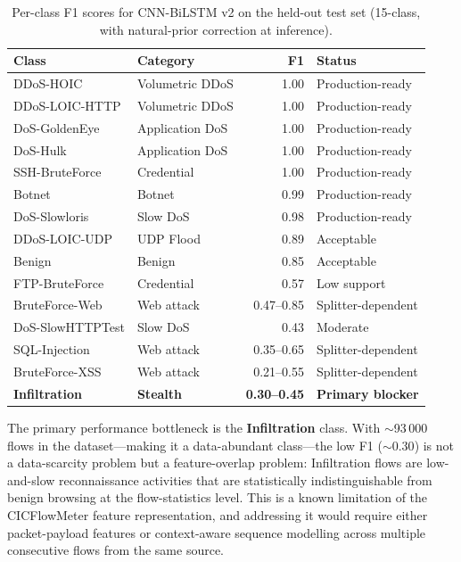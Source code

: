 \documentclass[12pt]{article}
\theoremstyle{plain}
\begin{document}
\begin{table}[H]
\centering
\caption{Per-class F1 scores for CNN-BiLSTM v2 on the held-out test set (15-class, with natural-prior correction at inference).}
\label{tab:perclass}
\begin{tabular}{llrl}
\toprule
\textbf{Class} & \textbf{Category} & \textbf{F1} & \textbf{Status} \\
\midrule
\rowcolor{lightgray}
DDoS-HOIC & Volumetric DDoS & 1.00 & Production-ready \\
DDoS-LOIC-HTTP & Volumetric DDoS & 1.00 & Production-ready \\
\rowcolor{lightgray}
DoS-GoldenEye & Application DoS & 1.00 & Production-ready \\
DoS-Hulk & Application DoS & 1.00 & Production-ready \\
\rowcolor{lightgray}
SSH-BruteForce & Credential & 1.00 & Production-ready \\
Botnet & Botnet & 0.99 & Production-ready \\
\rowcolor{lightgray}
DoS-Slowloris & Slow DoS & 0.98 & Production-ready \\
DDoS-LOIC-UDP & UDP Flood & 0.89 & Acceptable \\
\rowcolor{lightgray}
Benign & Benign & 0.85 & Acceptable \\
FTP-BruteForce & Credential & 0.57 & Low support \\
\rowcolor{lightgray}
BruteForce-Web & Web attack & 0.47--0.85 & Splitter-dependent \\
DoS-SlowHTTPTest & Slow DoS & 0.43 & Moderate \\
\rowcolor{lightgray}
SQL-Injection & Web attack & 0.35--0.65 & Splitter-dependent \\
BruteForce-XSS & Web attack & 0.21--0.55 & Splitter-dependent \\
\rowcolor{lightgray}
\textbf{Infiltration} & \textbf{Stealth} & \textbf{0.30--0.45} & \textbf{Primary blocker} \\
\bottomrule
\end{tabular}
\end{table}

The primary performance bottleneck is the \textbf{Infiltration} class. With $\sim$93\,000 flows in the dataset—making it a data-abundant class—the low F1 ($\sim 0.30$) is not a data-scarcity problem but a feature-overlap problem: Infiltration flows are low-and-slow reconnaissance activities that are statistically indistinguishable from benign browsing at the flow-statistics level. This is a known limitation of the CICFlowMeter feature representation, and addressing it would require either packet-payload features or context-aware sequence modelling across multiple consecutive flows from the same source.
\end{document}
